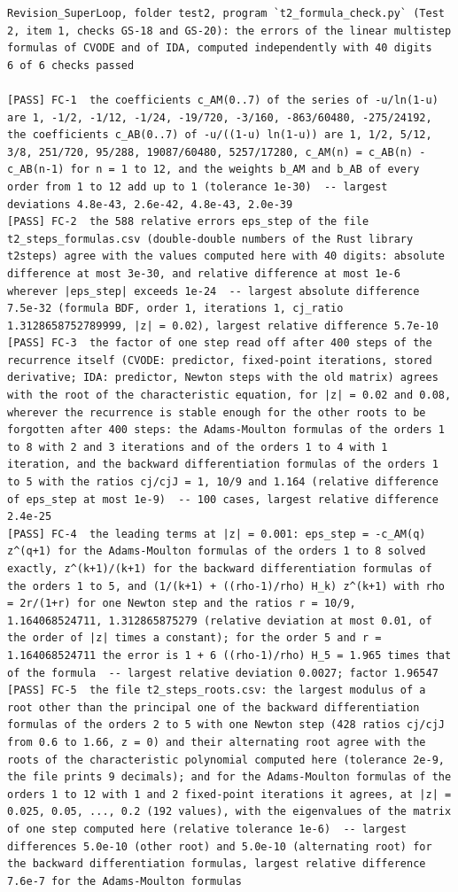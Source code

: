 \documentclass[
  10pt,
]{article}
\begin{document}
\begin{verbatim}
Revision_SuperLoop, folder test2, program `t2_formula_check.py` (Test 2, item 1, checks GS-18 and GS-20): the errors of the linear multistep formulas of CVODE and of IDA, computed independently with 40 digits
6 of 6 checks passed

[PASS] FC-1  the coefficients c_AM(0..7) of the series of -u/ln(1-u) are 1, -1/2, -1/12, -1/24, -19/720, -3/160, -863/60480, -275/24192, the coefficients c_AB(0..7) of -u/((1-u) ln(1-u)) are 1, 1/2, 5/12, 3/8, 251/720, 95/288, 19087/60480, 5257/17280, c_AM(n) = c_AB(n) - c_AB(n-1) for n = 1 to 12, and the weights b_AM and b_AB of every order from 1 to 12 add up to 1 (tolerance 1e-30)  -- largest deviations 4.8e-43, 2.6e-42, 4.8e-43, 2.0e-39
[PASS] FC-2  the 588 relative errors eps_step of the file t2_steps_formulas.csv (double-double numbers of the Rust library t2steps) agree with the values computed here with 40 digits: absolute difference at most 3e-30, and relative difference at most 1e-6 wherever |eps_step| exceeds 1e-24  -- largest absolute difference 7.5e-32 (formula BDF, order 1, iterations 1, cj_ratio 1.3128658752789999, |z| = 0.02), largest relative difference 5.7e-10
[PASS] FC-3  the factor of one step read off after 400 steps of the recurrence itself (CVODE: predictor, fixed-point iterations, stored derivative; IDA: predictor, Newton steps with the old matrix) agrees with the root of the characteristic equation, for |z| = 0.02 and 0.08, wherever the recurrence is stable enough for the other roots to be forgotten after 400 steps: the Adams-Moulton formulas of the orders 1 to 8 with 2 and 3 iterations and of the orders 1 to 4 with 1 iteration, and the backward differentiation formulas of the orders 1 to 5 with the ratios cj/cjJ = 1, 10/9 and 1.164 (relative difference of eps_step at most 1e-9)  -- 100 cases, largest relative difference 2.4e-25
[PASS] FC-4  the leading terms at |z| = 0.001: eps_step = -c_AM(q) z^(q+1) for the Adams-Moulton formulas of the orders 1 to 8 solved exactly, z^(k+1)/(k+1) for the backward differentiation formulas of the orders 1 to 5, and (1/(k+1) + ((rho-1)/rho) H_k) z^(k+1) with rho = 2r/(1+r) for one Newton step and the ratios r = 10/9, 1.164068524711, 1.312865875279 (relative deviation at most 0.01, of the order of |z| times a constant); for the order 5 and r = 1.164068524711 the error is 1 + 6 ((rho-1)/rho) H_5 = 1.965 times that of the formula  -- largest relative deviation 0.0027; factor 1.96547
[PASS] FC-5  the file t2_steps_roots.csv: the largest modulus of a root other than the principal one of the backward differentiation formulas of the orders 2 to 5 with one Newton step (428 ratios cj/cjJ from 0.6 to 1.66, z = 0) and their alternating root agree with the roots of the characteristic polynomial computed here (tolerance 2e-9, the file prints 9 decimals); and for the Adams-Moulton formulas of the orders 1 to 12 with 1 and 2 fixed-point iterations it agrees, at |z| = 0.025, 0.05, ..., 0.2 (192 values), with the eigenvalues of the matrix of one step computed here (relative tolerance 1e-6)  -- largest differences 5.0e-10 (other root) and 5.0e-10 (alternating root) for the backward differentiation formulas, largest relative difference 7.6e-7 for the Adams-Moulton formulas

\end{verbatim}
\end{document}

